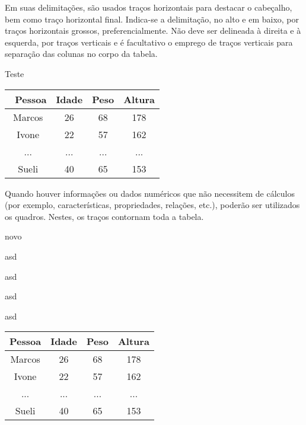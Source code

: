 \documentclass[12pt,oneside,a4paper,chapter=TITLE,section=TITLE,sumario
=tradicional]{abntex2}
\begin{document}
Em suas delimitações, são usados traços horizontais para destacar o cabeçalho, 
bem como traço horizontal final. Indica-se a delimitação, no alto e em baixo, 
por traços horizontais grossos, preferencialmente. Não deve ser delineada à 
direita e à esquerda, por traços verticais e é facultativo o emprego de traços 
verticais para separação das colunas no corpo da tabela.

Teste %

\cite{abntex2cite}




\begin{table}[htb]
    \begin{tabular}{c|ccc}
        \hline\
        \textbf{Pessoa} & \textbf{Idade} & \textbf{Peso} & \textbf{Altura} \\ 
        \hline\hline
        Marcos & 26    & 68   & 178    \\ 
        Ivone  & 22    & 57   & 162    \\ 
        ...    & ...   & ...  & ...    \\ 
        Sueli  & 40    & 65   & 153    \\ \hline
    \end{tabular}
    
    \fonteautor
\end{table}
 
Quando houver informações ou dados numéricos que não necessitem de cálculos 
(por exemplo, características, propriedades, relações, etc.), poderão ser 
utilizados os quadros. Nestes, os traços contornam toda a tabela.

\begin{lista}
	\item novo
	\item asd
	\item asd
	\item asd
	\item asd
\end{lista}

\begin{quadro}[htb]
    \begin{tabular}{|c||c|c|c|}
        \hline
        \textbf{Pessoa} & \textbf{Idade} & \textbf{Peso} & \textbf{Altura} \\ 
        \hline\hline
        Marcos & 26    & 68   & 178    \\ \hline
        Ivone  & 22    & 57   & 162    \\ \hline
        ...    & ...   & ...  & ...    \\ \hline
        Sueli  & 40    & 65   & 153    \\ \hline
    \end{tabular}
    
\end{quadro}
\end{document}
